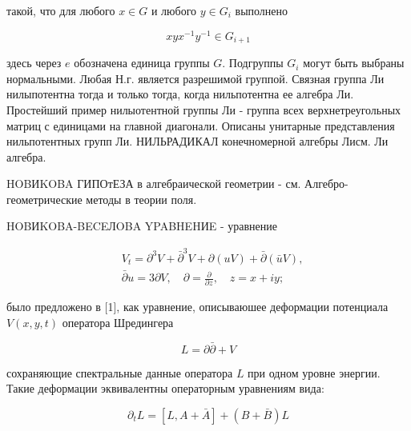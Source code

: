 \documentclass[10pt]{article}
\begin{document}
такой, что для любого $x \in G$ и любого $y \in G_{i}$ выполнено



\[

x y x^{-1} y^{-1} \in G_{i+1}

\]



здесь через $e$ обозначена единица группы $G$. Подгруппы $G_{i}$ могут быть выбраны нормальными. Любая Н.г. является разрешимой группой. Связная группа Ли нилыпотентна тогда и только тогда, когда нильпотентна ее алгебра Ли. Простейший пример нилыотентной группы Ли - группа всех верхнетреугольных матриц с единицами на главной диагонали. Описаны унитарные представления нильпотентных групп Ли. НИЛЬРАДИКАЛ конечномерной алгебры Лисм. Ли алгебра.



HOBИKOBA ГИПОтЕЗА в алгебраической геометрии - см. Алгебро-геометрические методы в теории поля.



HOBИKOBA-BECEЛOBA YPABHEHИE - уравнение



\[

\begin{aligned}

& V_{t}=\partial^{3} V+\bar{\partial}^{3} V+\partial(u V)+\bar{\partial}(\bar{u} V), \\

& \bar{\partial} u=3 \partial V, \quad \partial=\frac{\partial}{\partial z}, \quad z=x+i y ;

\end{aligned}

\]



было предложено в [1], как уравнение, описываюшее деформации потенциала $V(x, y, t)$ оператора Шредингера



\[

L=\partial \bar{\partial}+V

\]



сохраняющие спектральные данные оператора $L$ при одном уровне энергии. Такие деформации эквивалентны операторным уравнениям вида:



\[

\partial_{t} L=[L, A+\bar{A}]+(B+\bar{B}) L

\]
\end{document}
